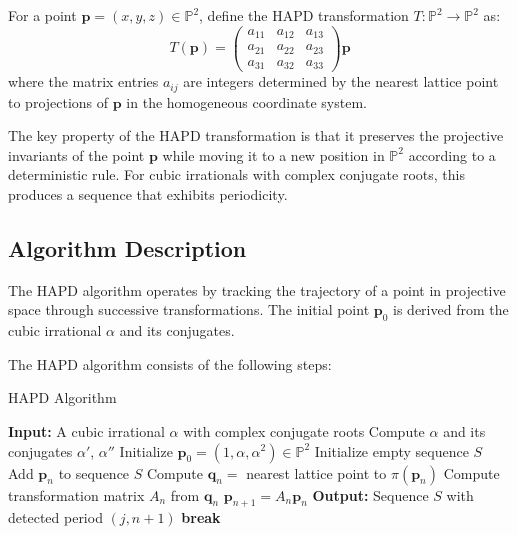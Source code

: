 \begin{definition}
For a point $\mathbf{p} = (x, y, z) \in \mathbb{P}^2$, define the HAPD transformation $T: \mathbb{P}^2 \rightarrow \mathbb{P}^2$ as:
\begin{equation}
T(\mathbf{p}) = 
\begin{pmatrix}
a_{11} & a_{12} & a_{13} \\
a_{21} & a_{22} & a_{23} \\
a_{31} & a_{32} & a_{33}
\end{pmatrix}
\mathbf{p}
\end{equation}
where the matrix entries $a_{ij}$ are integers determined by the nearest lattice point to projections of $\mathbf{p}$ in the homogeneous coordinate system.
\end{definition}

The key property of the HAPD transformation is that it preserves the projective invariants of the point $\mathbf{p}$ while moving it to a new position in $\mathbb{P}^2$ according to a deterministic rule. For cubic irrationals with complex conjugate roots, this produces a sequence that exhibits periodicity.

\subsection{Algorithm Description}

The HAPD algorithm operates by tracking the trajectory of a point in projective space through successive transformations. The initial point $\mathbf{p}_0$ is derived from the cubic irrational $\alpha$ and its conjugates.

The HAPD algorithm consists of the following steps:

\begin{algorithm}[H]
\caption{HAPD Algorithm}
\begin{algorithmic}[1]
\State \textbf{Input:} A cubic irrational $\alpha$ with complex conjugate roots
\State Compute $\alpha$ and its conjugates $\alpha'$, $\alpha''$
\State Initialize $\mathbf{p}_0 = (1, \alpha, \alpha^2) \in \mathbb{P}^2$
\State Initialize empty sequence $S$
    \State Add $\mathbf{p}_n$ to sequence $S$
    \State Compute $\mathbf{q}_n = $ nearest lattice point to $\pi(\mathbf{p}_n)$
    \State Compute transformation matrix $A_n$ from $\mathbf{q}_n$
    \State $\mathbf{p}_{n+1} = A_n \mathbf{p}_n$
        \State \textbf{Output:} Sequence $S$ with detected period $(j, n+1)$
        \State \textbf{break}
    \EndIf
\EndFor
\end{algorithmic}
\end{algorithm}

